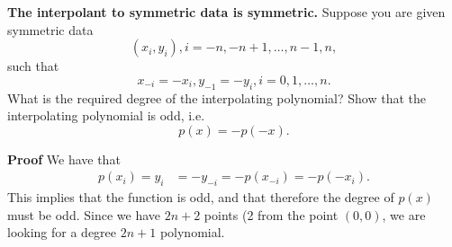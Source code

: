 \textbf{The interpolant to symmetric data is symmetric.} Suppose you are given symmetric data $$(x_i, y_i), i = -n, -n + 1, \ldots, n - 1, n, $$
such that 
$$ x_{-i} = -x_i, y_{-1} = -y_i, i = 0, 1, \ldots, n.$$
What is the required degree of the interpolating polynomial? Show that the interpolating polynomial is odd, i.e. $$p(x) = -p(-x).$$

\textbf{Proof}
We have that 
\begin{align*}
p(x_i) = y_i &= -y_{-i} = -p(x_{-i}) = - p(-x_i).
\end{align*}
This implies that the function is odd, and that therefore the degree of $p(x)$ must be odd. Since we have $2n + 2$ points (2 from the point $(0, 0)$, we are looking for a degree $2n + 1$ polynomial.